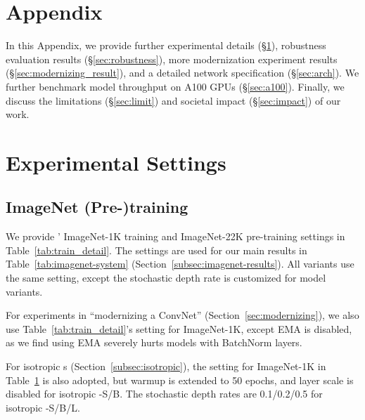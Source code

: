 \documentclass[10pt,twocolumn,letterpaper]{article}
\begin{document}
\appendix
\section*{\Large{Appendix}}
In this Appendix, we provide further experimental details (\S \ref{sec:setting}), robustness evaluation results (\S \ref{sec:robustness}), more modernization experiment results (\S\ref{sec:modernizing_result}), and a detailed network specification (\S \ref{sec:arch}). We further benchmark model throughput on A100 GPUs (\S \ref{sec:a100}). Finally, we discuss the limitations (\S \ref{sec:limit}) and societal impact (\S \ref{sec:impact}) of our work.



\section{Experimental Settings}
\label{sec:setting}
\subsection{ImageNet (Pre-)training} 
\label{subsec:setting}
We provide ' ImageNet-1K training and ImageNet-22K pre-training settings in Table~\ref{tab:train_detail}. The settings are used for our main results in Table~\ref{tab:imagenet-system} (Section~\ref{subsec:imagenet-results}).  All \cnn{} variants use the same setting, except the stochastic depth rate is customized for model variants. 

For experiments in ``modernizing a ConvNet'' (Section~\ref{sec:modernizing}), we also use Table~\ref{tab:train_detail}'s setting for ImageNet-1K, except EMA is disabled, as we find using EMA severely hurts models with BatchNorm layers.

For isotropic \cnn{}s (Section~\ref{subsec:isotropic}), the setting for ImageNet-1K in Table~\ref{sec:setting} is also adopted, but warmup is extended to 50 epochs, and layer scale is disabled for isotropic \cnn{}-S/B. The stochastic depth rates are 0.1/0.2/0.5 for isotropic \cnn{}-S/B/L.
\end{document}
